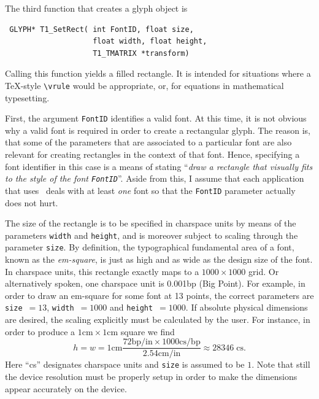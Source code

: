 The third function that creates a glyph object is 
\precorr 
\begin{verbatim}
 GLYPH* T1_SetRect( int FontID, float size,
                    float width, float height,
                    T1_TMATRIX *transform)
\end{verbatim}\postcorr
Calling this function yields a filled rectangle. It is intended for situations
where a \TeX-style \verb+\vrule+ would be appropriate, or, for equations in
mathematical typesetting. 

First, the argument \verb+FontID+ identifies a valid font. At this time, it is
not obvious why a valid font is required in order to create a rectangular
glyph. The reason is, that some of the parameters that are associated to a
particular font are also relevant for creating rectangles in the context of
that font. Hence, specifying a font identifier in this case is a means of
stating ``{\em draw a rectangle that visually fits to the style of the font
  \verb+FontID+}''. Aside from this, I assume that each application that uses
\tonelib\ deals with at least {\em one} font so that the \verb+FontID+
parameter actually does not hurt.

The size of the rectangle is to be specified in charspace units by means of
the parameters \verb+width+ and \verb+height+, and is moreover subject to
scaling through the parameter \verb+size+. By definition, the typographical
fundamental area of a font, known as the {\em em-square}, is just as high and
as wide as the design size of the font. In charspace units, this rectangle
exactly maps to a $1000 \times 1000$ grid. Or alternatively spoken, one
charspace unit is 0.001bp (Big Point). For example, in order to draw an
em-square for some font at 13 points, the correct parameters are
\hbox{\verb+size+ $= 13$}, \hbox{\verb+width+ $= 1000$} and
\hbox{\verb+height+ $= 1000$}. If absolute physical dimensions are desired,
the scaling explicitly must be calculated by the user. For instance, in order to
produce a $ 1 \mathrm{cm} \times 1 \mathrm{cm}$ square we find
\begin{displaymath}
h = w = 1\mathrm{cm} \frac{72\mathrm{bp}/\mathrm{in} \times
  1000\mathrm{cs}/\mathrm{bp}}{2.54\mathrm{cm}/\mathrm{in}} 
\approx 28346\;\mathrm{cs.}
\end{displaymath}
Here ``cs'' designates charspace units and \verb+size+ is assumed to be $1$.
Note that still the device resolution must be properly setup in order to make
the dimensions appear accurately on the device.

